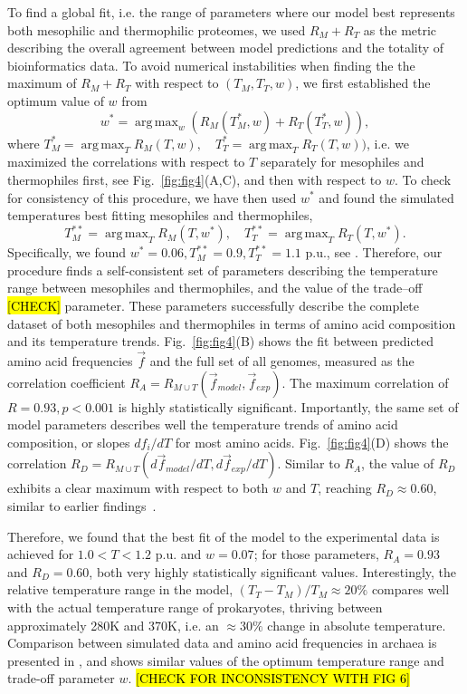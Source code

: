 \documentclass[10pt,letterpaper]{article}
\DeclareMathOperator*{\argmax}{arg\,max}
\begin{document}
To find a global fit, i.e. the range of parameters where our model best represents both mesophilic and thermophilic proteomes, we used $R_M + R_T$ as the metric describing the overall agreement between model predictions and the totality of bioinformatics data. To avoid numerical instabilities when finding the the maximum of $R_M+R_T$ with respect to $(T_M, T_T, w)$, we first established the optimum value of $w$ from
$$
w^* = \argmax_{w} (R_M(T_M^*, w) + R_T(T^*_T,w) ),
$$
where $T_M^*=\argmax_{T}R_M(T,w), \quad T_T^*=\argmax_{T}R_T(T,w))$, i.e. we maximized the correlations with respect to $T$ separately for mesophiles and thermophiles first, see Fig.~\ref{fig:fig4}(A,C), and then with respect to $w$. To check for consistency of this procedure, we have then used $w^*$ and found the simulated temperatures best fitting mesophiles and thermophiles, 
$$
T^{**}_M = \argmax_{T}R_M(T, w^*), \quad T^{**}_T = \argmax_{T}R_T(T, w^*).
$$
Specifically, we found $w^*=0.06,  T^{**}_M=0.9, T^{**}_T=1.1$ p.u., see . Therefore, our procedure finds a self-consistent set of parameters describing the temperature range between mesophiles and thermophiles, and the value of the trade--off \hl{[CHECK]} parameter. These parameters successfully describe the complete dataset of both mesophiles and thermophiles in terms of amino acid composition and its temperature trends. Fig.~\ref{fig:fig4}(B) shows the fit between predicted amino acid frequencies $\vec f$ and the full set of all genomes, measured as the correlation coefficient $R_A = R_{M \cup T}(\vec f_{model}, \vec f_{exp})$. The maximum correlation of $R=0.93, p<0.001$ is highly statistically significant. Importantly, the same set of model parameters describes well the temperature trends of amino acid composition, or slopes $df_i/dT$ for most amino acids. Fig.~\ref{fig:fig4}(D) shows the correlation $R_D = R_{M\cup T}(d\vec f_{model}{/dT}, d\vec f_{exp}/dT)$. Similar to $R_A$, the value of $R_D$ exhibits a clear maximum with respect to both $w$ and $T$, reaching $R_D\approx0.60$, similar to earlier findings~\cite{Venev2015Massively}.

Therefore, we found that the best fit of the model to the experimental data is achieved for $1.0<T<1.2$ p.u. and $w=0.07$; for those parameters, $R_A=0.93$ and $R_D=0.60$, both very highly statistically significant values. Interestingly, the relative temperature range in the model, $(T_T-T_M)/T_M\approx 20\%$ compares well with the actual temperature range of prokaryotes, thriving between approximately 280K and 370K, i.e. an $\approx 30\%$ change in absolute temperature. Comparison between simulated data and amino acid frequencies in archaea is presented in , and shows similar values of the optimum temperature range and trade-off parameter $w$. \hl{[CHECK FOR INCONSISTENCY WITH FIG 6]}
\end{document}
